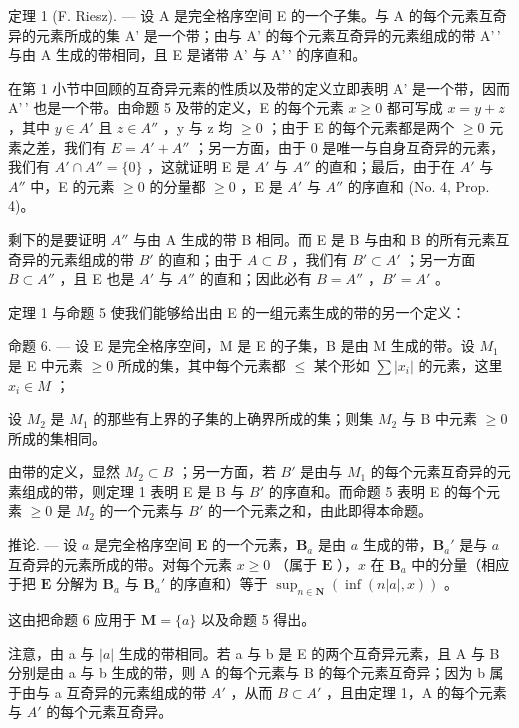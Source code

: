 定理 1 (F. Riesz). --- 设 A 是完全格序空间 E 的一个子集。与 A 的每个元素互奇异的元素所成的集 A' 是一个带；由与 A' 的每个元素互奇异的元素组成的带 A'\,' 与由 A 生成的带相同，且 E 是诸带 A' 与 A'\,' 的序直和。

在第 1 小节中回顾的互奇异元素的性质以及带的定义立即表明 A' 是一个带，因而 A'\,' 也是一个带。由命题 5 及带的定义，E 的每个元素 \(x \geqslant 0\) 都可写成 \(x = y + z\) ，其中 \(y \in A'\) 且 \(z \in A''\) ，y 与 z 均 \(\geqslant 0\) ；由于 E 的每个元素都是两个 \(\geqslant 0\) 元素之差，我们有 \(E = A' + A''\) ；另一方面，由于 0 是唯一与自身互奇异的元素，我们有 \(A' \cap A'' = \{0\}\) ，这就证明 E 是 \(A'\) 与 \(A''\) 的直和；最后，由于在 \(A'\) 与 \(A''\) 中，E 的元素 \(\geqslant 0\) 的分量都 \(\geqslant 0\) ，E 是 \(A'\) 与 \(A''\) 的序直和 (No. 4, Prop. 4)。

剩下的是要证明 \(A''\) 与由 A 生成的带 B 相同。而 E 是 B 与由和 B 的所有元素互奇异的元素组成的带 \(B'\) 的直和；由于 \(A \subset B\) ，我们有 \(B' \subset A'\) ；另一方面 \(B \subset A''\) ，且 E 也是 \(A'\) 与 \(A''\) 的直和；因此必有 \(B = A''\) ，\(B' = A'\) 。

定理 1 与命题 5 使我们能够给出由 E 的一组元素生成的带的另一个定义：

命题 6. --- 设 E 是完全格序空间，M 是 E 的子集，B 是由 M 生成的带。设 \(M_{1}\) 是 E 中元素 \(\geqslant 0\) 所成的集，其中每个元素都 \(\leqslant\) 某个形如 \(\sum |x_{i}|\) 的元素，这里 \(x_{i} \in M\) ；

设 \(M_{2}\) 是 \(M_{1}\) 的那些有上界的子集的上确界所成的集；则集 \(M_{2}\) 与 B 中元素 \(\geqslant0\) 所成的集相同。

由带的定义，显然 \(M_{2} \subset B\) ；另一方面，若 \(B'\) 是由与 \(M_{1}\) 的每个元素互奇异的元素组成的带，则定理 1 表明 E 是 B 与 \(B'\) 的序直和。而命题 5 表明 E 的每个元素 \(\geqslant 0\) 是 \(M_{2}\) 的一个元素与 \(B'\) 的一个元素之和，由此即得本命题。

推论. --- 设 \(a\) 是完全格序空间 \(\mathbf{E}\) 的一个元素，\(\mathbf{B}_a\) 是由 \(a\) 生成的带，\(\mathbf{B}_a'\) 是与 \(a\) 互奇异的元素所成的带。对每个元素 \(x \geqslant 0\) （属于 \(\mathbf{E}\) ），\(x\) 在 \(\mathbf{B}_a\) 中的分量（相应于把 \(\mathbf{E}\) 分解为 \(\mathbf{B}_a\) 与 \(\mathbf{B}_a'\) 的序直和）等于 \(\sup_{n \in \mathbf{N}} \left( \inf(n|a|, x) \right)\) 。

这由把命题 6 应用于 \(\mathbf{M} = \{a\}\) 以及命题 5 得出。

注意，由 a 与 \(|a|\) 生成的带相同。若 a 与 b 是 E 的两个互奇异元素，且 A 与 B 分别是由 a 与 b 生成的带，则 A 的每个元素与 B 的每个元素互奇异；因为 b 属于由与 a 互奇异的元素组成的带 \(A'\) ，从而 \(B \subset A'\) ，且由定理 1，A 的每个元素与 \(A'\) 的每个元素互奇异。

